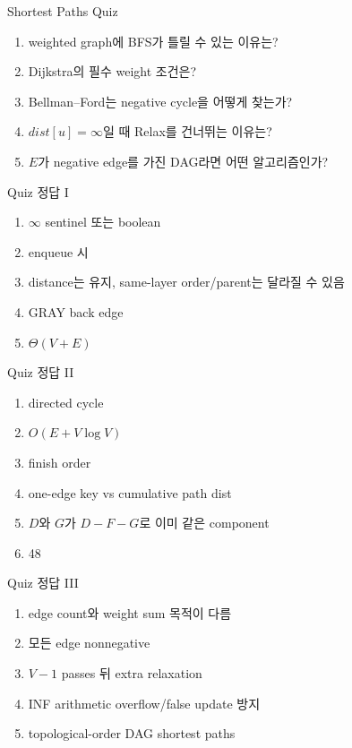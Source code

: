\begin{frame}{Shortest Paths Quiz}
\small\begin{enumerate}\item weighted graph에 BFS가 틀릴 수 있는 이유는?\item Dijkstra의 필수 weight 조건은?\item Bellman--Ford는 negative cycle을 어떻게 찾는가?\item \(dist[u]=\infty\)일 때 Relax를 건너뛰는 이유는?\item \(E\)가 negative edge를 가진 DAG라면 어떤 알고리즘인가?\end{enumerate}
\end{frame}
\begin{frame}{Quiz 정답 I}
\small\begin{enumerate}\item \(\infty\) sentinel 또는 boolean\item enqueue 시\item distance는 유지, same-layer order/parent는 달라질 수 있음\item GRAY back edge\item \(\Theta(V+E)\)\end{enumerate}
\end{frame}
\begin{frame}{Quiz 정답 II}
\scriptsize\begin{enumerate}\item directed cycle\item \(O(E+V\log V)\)\item finish order\item one-edge key vs cumulative path dist\item \(D\)와 \(G\)가 \(D-F-G\)로 이미 같은 component\item 48\end{enumerate}
\end{frame}
\begin{frame}{Quiz 정답 III}
\small\begin{enumerate}\item edge count와 weight sum 목적이 다름\item 모든 edge nonnegative\item \(V-1\) passes 뒤 extra relaxation\item INF arithmetic overflow/false update 방지\item topological-order DAG shortest paths\end{enumerate}
\end{frame}
